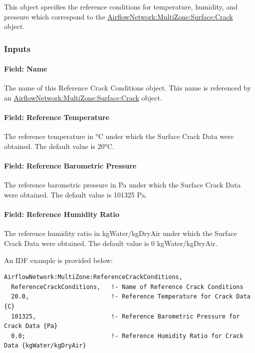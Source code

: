 This object specifies the reference conditions for temperature, humidity, and pressure which correspond to the \hyperref[airflownetworkmultizonesurfacecrack]{AirflowNetwork:MultiZone:Surface:Crack} object.

\subsubsection{Inputs}\label{inputs-1-004}

\paragraph{Field: Name}\label{field-name-1-003}

The name of this Reference Crack Conditions object. This name is referenced by an \hyperref[airflownetworkmultizonesurfacecrack]{AirflowNetwork:MultiZone:Surface:Crack} object.

\paragraph{Field: Reference Temperature}\label{field-reference-temperature}

The reference temperature in °C under which the Surface Crack Data were obtained. The default value is 20°C.

\paragraph{Field: Reference Barometric Pressure}\label{field-reference-barometric-pressure}

The reference barometric pressure in Pa under which the Surface Crack Data were obtained. The default value is 101325 Pa.

\paragraph{Field: Reference Humidity Ratio}\label{field-reference-humidity-ratio}

The reference humidity ratio in kgWater/kgDryAir under which the Surface Crack Data were obtained. The default value is 0 kgWater/kgDryAir.

An IDF example is provided below:

\begin{lstlisting}
AirflowNetwork:MultiZone:ReferenceCrackConditions,
  ReferenceCrackConditions,   !- Name of Reference Crack Conditions
  20.0,                       !- Reference Temperature for Crack Data {C}
  101325,                     !- Reference Barometric Pressure for Crack Data {Pa}
  0.0;                        !- Reference Humidity Ratio for Crack Data {kgWater/kgDryAir}
\end{lstlisting}

